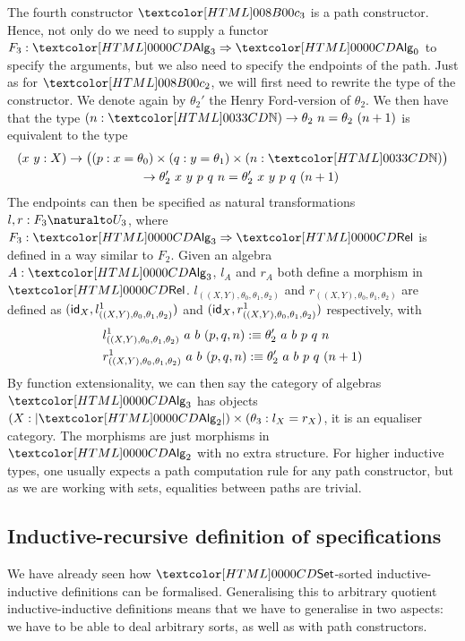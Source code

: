 The fourth constructor $\Bciii$ is a path constructor. Hence, not only
do we need to supply a functor $F_3 : \Func{\Alg_3}{\Alg_0}$ to
specify the arguments, but we also need to specify the endpoints of
the path. Just as for $\Bcii$, we will first need to rewrite the type
of the constructor. We denote again by $\theta_2'$ the Henry
Ford-version of $\theta_2$.  We then have that the type
$(n : \natty) \to \theta_2\ n = \theta_2\ (n+ 1)$ is equivalent to the
type
%
\begin{multline*}
(x\ y : X) \to \big((p : x =  \theta_0) \times (q : y = \theta_1) \times (n : \natty)\big) \\
\ \ \ \ \to \theta_2'\ x\ y\ p\ q\ n = \theta_2'\ x\ y\ p\ q\ (n+1)
\end{multline*}
%
The endpoints can then be specified as natural transformations
$l, r : \Nat{F_3}{U_3}$, where $F_3 : \Func{\Alg_3}{\Rel}$ is defined in a
way similar to $F_2$. Given an algebra $A : \Alg_3$, $l_A$ and $r_A$
both define a morphism in
$\Rel$. $l_{((X,Y),\theta_0,\theta_1,\theta_2)}$ and
$r_{((X,Y),\theta_0,\theta_1,\theta_2)}$ are defined as
$(\mathsf{id}_X, l^1_{((X,Y),\theta_0,\theta_1,\theta_2)})$ and
$(\mathsf{id}_X,r^1_{((X,Y),\theta_0,\theta_1,\theta_2)})$ respectively, with
%
\begin{align*}
&l^1_{((X,Y),\theta_0,\theta_1,\theta_2)}\ a\ b\ (p, q, n) :\equiv \theta_2'\ a\ b\ p\ q\ n \\
&r^1_{((X,Y),\theta_0,\theta_1,\theta_2)}\ a\ b\ (p, q, n) :\equiv \theta_2'\ a\ b\ p\ q\ (n+1)
\end{align*}
%
By function extensionality, we can then say the category of algebras
$\Alg_3$ has objects $(X : | \Alg_2 |) \times (\theta_3 : l_X = r_X)$,
\ie it is an equaliser category. The morphisms are just morphisms in
$\Alg_2$ with no extra structure. For higher inductive types, one
usually expects a path computation rule for any path constructor, but
as we are working with sets, equalities between paths are trivial.

\subsection{Inductive-recursive definition of specifications}

We have already seen how $\Set$-sorted inductive-inductive definitions
can be formalised. Generalising this to arbitrary quotient
inductive-inductive definitions means that we have to generalise in
two aspects: we have to be able to deal arbitrary sorts, as well as
with path constructors.

